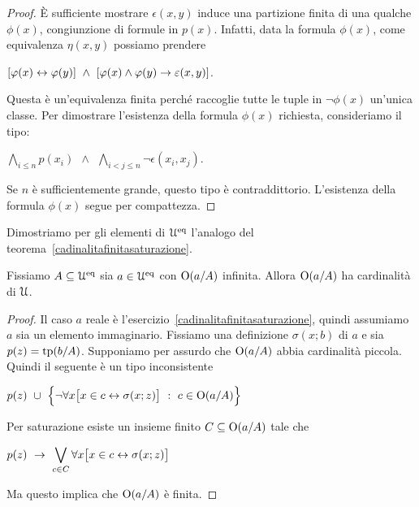 \begin{proof} \`E sufficiente mostrare $\epsilon(x,y)$ induce una partizione finita di una qualche $\phi(x)$, congiunzione di formule in $p(x)$. Infatti, data la formula $\phi(x)$, come equivalenza $\eta(x,y)$ possiamo prendere 

\hfil$[\phi(x)\iff\phi(y)]\ \wedge\ [\phi(x)\wedge\phi(y)\imp\epsilon(x,y)]$. 

Questa \`e un'equivalenza finita perch\'e raccoglie tutte le tuple in $\neg\phi(x)$ un'unica classe. Per dimostrare l'esistenza della formula $\phi(x)$ richiesta, consideriamo il tipo:

\hfil$\displaystyle\bigwedge_{i\le n} p(x_i)\ \ \wedge \ \ \bigwedge_{i<j\le n} \neg\epsilon(x_i,x_j)$.

Se $n$ \`e sufficientemente grande, questo tipo \`e contraddittorio. L'esistenza della formula $\phi(x)$ segue per compattezza.
\end{proof}

Dimostriamo per gli elementi di $\EuScript U^{\rm eq}$ l'analogo del teorema~\ref{cadinalitafinitasaturazione}.%

\begin{lemma}\label{cadinalitafinitasaturazioneimmaginari}
Fissiamo $A\subseteq\EuScript U^{\rm eq}$ sia $a\in\EuScript U^{\rm eq}$ con $\textrm{O}(a/A)$ infinita. Allora $\textrm{O}(a/A)$ ha cardinalit\`a di $\EuScript U$.
\end{lemma}

\begin{proof} 
Il caso $a$ reale \`e l'esercizio~\ref{cadinalitafinitasaturazione}, quindi assumiamo $a$ sia un elemento immaginario. Fissiamo una definizione $\sigma(x;b)$ di $a$ e sia $p(z)=\textrm{tp}(b/A)$. Supponiamo per assurdo che $\textrm{O}(a/A)$ abbia cardinalit\`a piccola. Quindi il seguente \`e un tipo inconsistente

\hfil $\displaystyle p(z)\ \cup\  \Big\{\neg\forall x\big[x\in c\leftrightarrow\sigma(x;z)\big]\ :\ c\in \textrm{O}(a/A)\Big\}$

Per saturazione esiste un insieme finito $C\subseteq\textrm{O}(a/A)$ tale che 

\hfil $\displaystyle p(z)\ \rightarrow\ \bigvee_{c\in C} \forall x\big[x\in c\leftrightarrow\sigma(x;z)\big]$

Ma questo implica che $\textrm{O}(a/A)$ \`e finita.
\end{proof}

